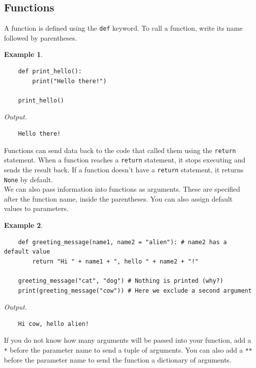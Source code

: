 \documentclass[11pt]{scrartcl}
\theoremstyle{definition}
\newtheorem*{example}{Example}
\begin{document}
\subsection{Functions}

A function is defined using the \texttt{def} keyword. To call a function, write its name followed by 
parentheses.

\begin{example}
    \
\begin{verbatim}
    def print_hello():
        print("Hello there!")
    
    print_hello()
\end{verbatim}
    \textit{Output.}
\begin{verbatim}
    Hello there!
\end{verbatim}
\end{example}

Functions can send data back to the code that called them using the \texttt{return} statement. When 
a function reaches a \texttt{return} statement, it stops executing and sends the result back. If a 
function doesn't have a \texttt{return} statement, it returns \texttt{None} by default. \\[-0.5em]

We can also pass information into functions as arguments. These are specified after the function name, inside the 
parentheses. You can also assign default values to parameters.

\begin{example}
    \
\begin{verbatim}
    def greeting_message(name1, name2 = "alien"): # name2 has a default value
        return "Hi " + name1 + ", hello " + name2 + "!"
    
    greeting_message("cat", "dog") # Nothing is printed (why?)
    print(greeting_message("cow")) # Here we exclude a second argument
\end{verbatim}
    \textit{Output.}
\begin{verbatim}
    Hi cow, hello alien!
\end{verbatim}
\end{example}

If you do not know how many arguments will be passed into your function, add a \texttt{*} before the 
parameter name to send a tuple of arguments. You can also add a \texttt{**} before the parameter name 
to send the function a dictionary of arguments.
\end{document}
